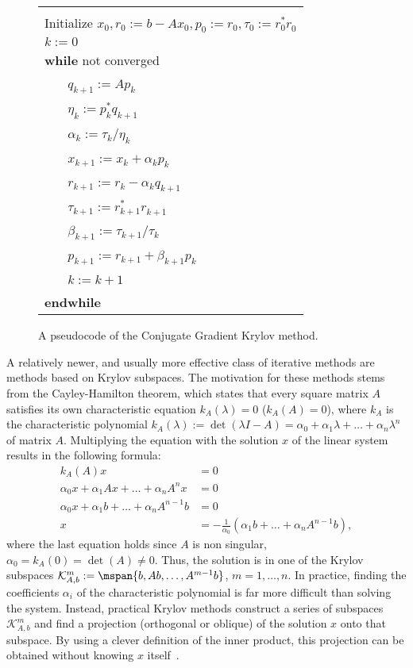 \begin{figure}
\begin{center}
\begin{tabular}{|l|}
\hline
\\Initialize $x_0, r_0 := b-Ax_0, p_0 := r_0, \tau_0 := r_{0}^* r_{0}^{}$
\\ $k := 0$                                                
\\ {\bf while} not converged
\\ ~~~ $q_{k+1}:=Ap_{k}$                        
\\ ~~~ $\eta_k:=p_{k}^*q_{k+1}^{}$    
\\ ~~~ $\alpha_k:=\tau_k/\eta_k$    
\\ ~~~ $x_{k+1}:=x_k+\alpha_k p_{k}$           
\\ ~~~ $r_{k+1}:=r_k-\alpha_k q_{k+1}$            
\\ ~~~ $\tau_{k+1}:= r_{k+1}^* r_{k+1}^{}$  
\\ ~~~ $\beta_{k+1}:=\tau_{k+1}/\tau_{k}$  
\\ ~~~ $p_{k+1}:= r_{k+1} + \beta_{k+1} p_k$ 

\\ ~~~ $k:=k+1$   
\\ {\bf endwhile}  
\\\hline
\end{tabular}
\end{center}
\caption{A pseudocode of the Conjugate Gradient Krylov method.}
\label{introduction:fig:cg}
\end{figure}

A relatively newer, and usually more effective class of iterative methods are
methods based on Krylov subspaces. The motivation for these methods stems from
the Cayley-Hamilton theorem, which states that every square matrix $A$ satisfies
its own characteristic equation $k_A(\lambda) = 0$ (\ie $k_A(A) = 0$), where
$k_A$ is the characteristic polynomial $k_A(\lambda) := \det(\lambda I - A) =
\alpha_0 + \alpha_1 \lambda + \ldots + \alpha_n \lambda^n$ of matrix $A$.
Multiplying the equation with the solution $x$ of the linear system results in
the following formula:
\begin{align}
    k_A(A)x &= 0\\
    \alpha_0 x + \alpha_1 Ax + \ldots + \alpha_n A^n x &= 0\\
    \alpha_0 x + \alpha_1 b + \ldots + \alpha_n A^{n-1} b &= 0\\
    x &= -\frac{1}{\alpha_0}(\alpha_1 b + \ldots + \alpha_n A^{n-1}b),
\end{align}
where the last equation holds since $A$ is non singular, \ie $\alpha_0 = k_A(0)
= \det(A) \neq 0$. Thus, the solution is in one of the Krylov subspaces
$\mathcal{K}_{A, b}^m := \mspan\{b, Ab, \ldots, A^{m-1}b\}$, $m = 1, \ldots, n$.
In practice, finding the coefficients $\alpha_i$ of the characteristic
polynomial is far more difficult than solving the system. Instead, practical
Krylov methods construct a series of subspaces $\mathcal{K}_{A,b}^m$ and find a
projection (orthogonal or oblique) of the solution $x$ onto that subspace. By
using a clever definition of the inner product, this projection can be
obtained without knowing $x$ itself~\cite{demmel,saad}.


